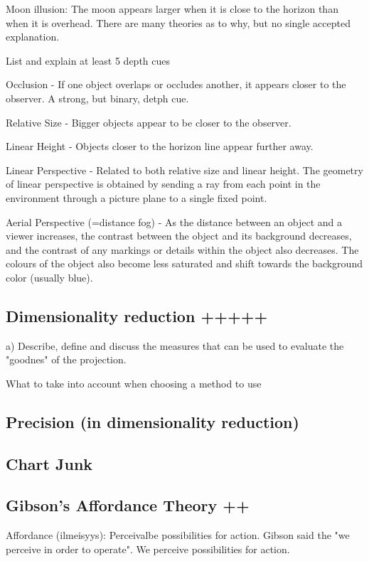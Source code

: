\documentclass[a4paper]{article}
\begin{document}
Moon illusion: The moon appears larger when it is close to the horizon than when it is overhead. There are many theories as to why, but no single accepted explanation.


List and explain at least 5 depth cues

Occlusion - If one object overlaps or occludes another, it appears closer to the observer. A strong, but binary, detph cue.

Relative Size - Bigger objects appear to be closer to the observer.

Linear Height - Objects closer to the horizon line appear further away.

Linear Perspective - Related to both relative size and linear height. The geometry of linear perspective is obtained by sending a ray from each point in the environment through a picture plane to a single fixed point.

Aerial Perspective (=distance fog) - As the distance between an object and a viewer increases, the contrast between the object and its background decreases, and the contrast of any markings or details within the object also decreases. The colours of the object also become less saturated and shift towards the background color (usually blue).

\subsection{Dimensionality reduction +++++}

a) Describe, define and discuss the measures that can be used to evaluate the "goodnes" of the projection.

What to take into account when choosing a method to use

\subsection{Precision (in dimensionality reduction)}

\subsection{Chart Junk}

\subsection{Gibson's Affordance Theory ++}

Affordance (ilmeisyys): Perceivalbe possibilities for action. Gibson said the "we perceive in order to operate". We perceive possibilities for action. 
\end{document}
